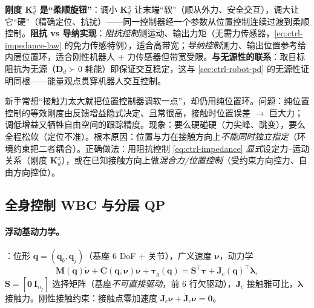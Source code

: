 \begin{insight}
\textbf{刚度 $\mathbf{K}_d^x$ 是“柔顺旋钮”}：调小 $\mathbf{K}_d^x$ 让末端“软”（顺从外力、安全交互），调大让它“硬”（精确定位、抗扰）——同一控制器经一个参数从位置控制连续过渡到柔顺控制。\textbf{阻抗 vs 导纳实现}：\emph{阻抗控制}测运动、输出力矩（无需力传感器，\cref{eq:ctrl-impedance-law} 的免力传感特例），适合高带宽；\emph{导纳控制}测力、输出位置参考给内层位置环，适合刚性机器人 + 力传感器但带宽受限。\textbf{与无源性的联系}：取目标阻抗为无源（$\mathbf{D}_d\succ0$ 耗能）即保证交互稳定，这与 \cref{sec:ctrl-robot-pd} 的无源性证明同根——能量观点贯穿机器人交互控制。
\end{insight}

\begin{pitfall}
新手常想“接触力太大就把位置控制器调软一点”，却仍用纯位置环。问题：纯位置控制的等效刚度由反馈增益隐式决定、且常很高，接触时位置误差 $\to$ 巨大力；调低增益又牺牲自由空间的跟踪精度。现象：要么硬碰硬（力尖峰、跳变），要么全程松软（定位不准）。根本原因：位置与力在接触方向上\emph{不能同时独立指定}（环境约束把二者耦合）。正确做法：用阻抗控制 \cref{eq:ctrl-impedance} \emph{显式}设定力--运动关系（刚度 $\mathbf{K}_d^x$），或在已知接触方向上做\emph{混合力/位置控制}（受约束方向控力、自由方向控位）。
\end{pitfall}

\subsection{全身控制 WBC 与分层 QP}
\label{sec:ctrl-robot-wbc}

\paragraph{浮动基动力学。}
：位形 $\mathbf{q}=(\mathbf{q}_b,\mathbf{q}_j)$（基座 6 DoF + 关节），广义速度 $\boldsymbol{\nu}$，动力学
\begin{equation}
  \mathbf{M}(\mathbf{q})\dot{\boldsymbol{\nu}}+\mathbf{C}(\mathbf{q},\boldsymbol{\nu})\boldsymbol{\nu}+\boldsymbol{\tau}_g(\mathbf{q})=\mathbf{S}^\top\boldsymbol{\tau}+\mathbf{J}_c(\mathbf{q})^\top\boldsymbol{\lambda},
  \label{eq:ctrl-floatbase}
\end{equation}
$\mathbf{S}=[\mathbf{0}\ \mathbf{I}_{n_j}]$ 选择矩阵（基座\emph{不可直接驱动}，前 6 行欠驱动），$\mathbf{J}_c$ 接触雅可比，$\boldsymbol{\lambda}$ 接触力。刚性接触约束：接触点零加速度 $\mathbf{J}_c\dot{\boldsymbol{\nu}}+\dot{\mathbf{J}}_c\boldsymbol{\nu}=\mathbf{0}$。


